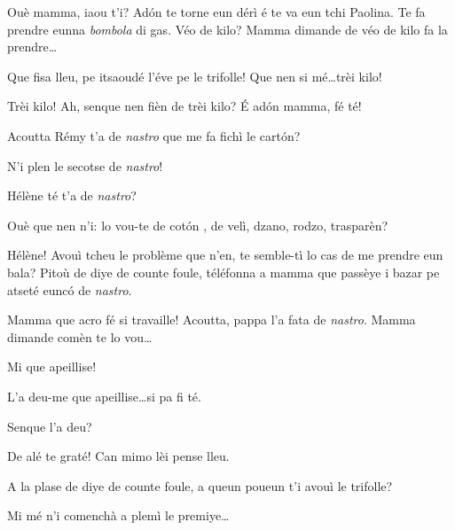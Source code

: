 \begin{drama}

\Remyspeaks Ouè mamma, iaou t'i? Ad\'on te torne eun dérì é te va eun tchi Paolina. Te fa prendre eunna \textit{bombola} di gas. Véo de kilo?  Mamma dimande de véo de kilo fa la prendre\ldots

\Cesarspeaks{} Que fisa lleu, pe itsaoudé l'éve pe le trifolle! Que nen si mé\ldots trèi kilo!

\Remyspeaks {} Trèi kilo! Ah, senque nen fièn de trèi kilo? É ad\'on mamma, fé té!


\Cesarspeaks{}	Acoutta Rémy t'a de \textit{nastro} que me fa fichì le cart\'on?

\Remyspeaks{} N'i plen le secotse de \textit{nastro}! 

\Cesarspeaks {} Hélène té t'a de \textit{nastro}?

\Helenespeaks  {} Ouè que nen n'i: lo vou-te de cot\'on , de velì, dzano, rodzo, trasparèn?

\Cesarspeaks{} Hélène! Avouì tcheu le problème que n'en, te semble-tì lo cas de me prendre eun bala? Pitoù de diye de counte foule,  téléfonna a mamma que passèye i bazar pe atseté eunc\'o de \textit{nastro}.


\Helenespeaks Mamma que acro fé si travaille! Acoutta, pappa l'a fata de \textit{nastro}.  Mamma dimande comèn te lo vou\ldots

\Cesarspeaks{} Mi que apeillise!

\Helenespeaks {} L'a deu-me que apeillise\ldots si pa fi té.


\Cesarspeaks Senque l'a deu?

\Helenespeaks{} De alé te graté! Can mimo lèi pense lleu.

\Cesarspeaks A la plase de diye de counte foule, a queun poueun t'i avouì le trifolle?

\Helenespeaks  Mi mé n'i comenchà a plemì le premiye\ldots 


\end{drama}
